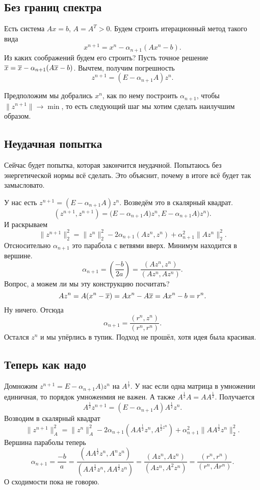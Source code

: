 \subsection{Без границ спектра}
Есть система $Ax = b$, $A= A^T>0$. Будем строить итерационный метод такого вида
\[
  x^{n+1} = x^n - \alpha_{n+1} (A x^n - b).
\]
Из каких соображений будем его строить? Пусть точное решение $\overline{x} = \overline{x} - \alpha_{n+1}(A\overline{x}- b)$. Вычтем, получим погрешность
\[
  z^{n+1} = (E - \alpha_{n+1} A)z^n.
\]

Предположим мы добрались $x^n$, как по нему построить $\alpha_{n+1}$, чтобы $\|z^{n+1}\|\to \min$, то есть следующий шаг мы хотим сделать наилучшим образом.

\subsection{Неудачная попытка}
Сейчас будет попытка, которая закончится неудачной. Попытаюсь без энергетической нормы всё сделать. Это объяснит, почему в итоге всё будет так замысловато.

У нас есть $z^{n+1} = (E - \alpha_{n+1} A)z^n$. Возведём это в скалярный квадрат.
\[
  (z^{n+1},z^{n+1}) = \big(E - \alpha_{n+1} A)z^n,E - \alpha_{n+1} A)z^n\big).
\]
И раскрываем
\[
  \|z^{n+1}\|_2^2 = \|z^n\|_2^2 - 2\alpha_{n+1} (Az^n,z^n) + \alpha^2_{n+1}\|Az^n\|_2^2.
\]
Отсносительно $\alpha_{n+1}$ это парабола с ветвями вверх. Минимум находится в вершине.
\[
  \alpha_{n+1} = \left( \frac{-b}{2a} \right) = \frac{(Az^n,z^n)}{(Az^n,Az^n)}.
\]
Вопрос, а можем ли мы эту конструкцию посчитать?
\[
  Az^n = A(x^n-\overline{x}) = A x^n - A \overline{x} = Ax^n - b = r^n.
\]
Ну ничего. Отсюда
\[
  \alpha_{n+1} = \frac{(r^n,z^n)}{(r^n,r^n)}.
\]
Остался $z^n$ и мы упёрлись в тупик. Подход не прошёл, хотя идея была красивая.
\subsection{Теперь как надо}
Домножим $z^{n+1} = E - \alpha_{n+1} A)z^n$ на $A^{\frac12}$. У нас если одна матрица в умножении единичная, то порядок умноженмия не важен. А также $A^{\frac12}A = A A^{\frac12}$. Получается
\[
  A^{\frac12} z^{n+1} = (E - \alpha_{n+1}A)A^{\frac12}z^n.
\]
Возводим в скалярный квадрат
\[
  \|z^{n+1}\|_A^2 = \|z^n\|^2_A - 2\alpha_{n+1} (A A^{\frac12}z^n,A^{\frac12 z^n}) + \alpha_{n+1}^2 \|A A^{\frac12} z^n\|^2_2.
\]
Вершина параболы теперь
\[
  \alpha_{n+1} = \frac{-b}a = \frac{ (A A^{\frac12} z^n,A^nz^n)}{(A A^{\frac12} z^n,A A^{\frac12} z^n)} = \frac{(Az^n,Az^n)}{(Az^n,A^2z^n)} = \frac{(r^n,r^n)}{(r^n,Ar^n)}.
\]
О сходимости пока не говорю.
